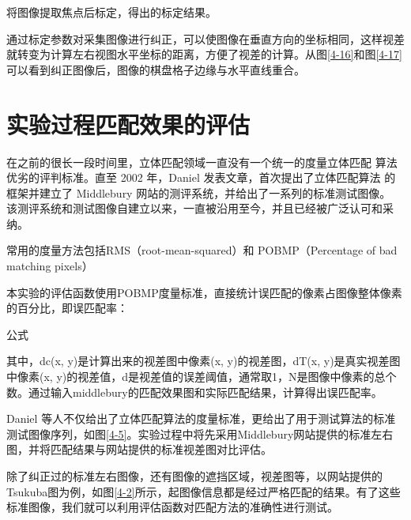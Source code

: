
将图像提取焦点后标定，得出的标定结果。

通过标定参数对采集图像进行纠正，可以使图像在垂直方向的坐标相同，这样视差就转变为计算左右视图水平坐标的距离，方便了视差的计算。从图\ref{4-16}和图\ref{4-17}可以看到纠正图像后，图像的棋盘格子边缘与水平直线重合。



\section{实验过程匹配效果的评估}

在之前的很长一段时间里，立体匹配领域一直没有一个统一的度量立体匹配
算法优劣的评判标准。直至 2002 年，Daniel 发表文章，首次提出了立体匹配算法
的框架并建立了 Middlebury 网站的测评系统，并给出了一系列的标准测试图像。
该测评系统和测试图像自建立以来，一直被沿用至今，并且已经被广泛认可和采
纳。

常用的度量方法包括RMS（root-mean-squared）和 POBMP（Percentage of bad matching pixels）

本实验的评估函数使用POBMP度量标准，直接统计误匹配的像素占图像整体像素的百分比，即误匹配率：

{{{公式}}}

其中，dc(x, y)是计算出来的视差图中像素(x, y)的视差图，dT(x, y)是真实视差图中像素(x, y)的视差值，d是视差值的误差阈值，通常取1，N是图像中像素的总个数。通过输入middlebury的匹配效果图和实际匹配结果，计算得出误匹配率。

Daniel 等人不仅给出了立体匹配算法的度量标准，更给出了用于测试算法的标准测试图像序列，如图\ref{4-5}。实验过程中将先采用Middlebury网站提供的标准左右图，并将匹配结果与网站提供的标准视差图对比评估。


除了纠正过的标准左右图像，还有图像的遮挡区域，视差图等，以网站提供的Tsukuba图为例，如图\ref{4-2}所示，起图像信息都是经过严格匹配的结果。有了这些标准图像，我们就可以利用评估函数对匹配方法的准确性进行测试。



